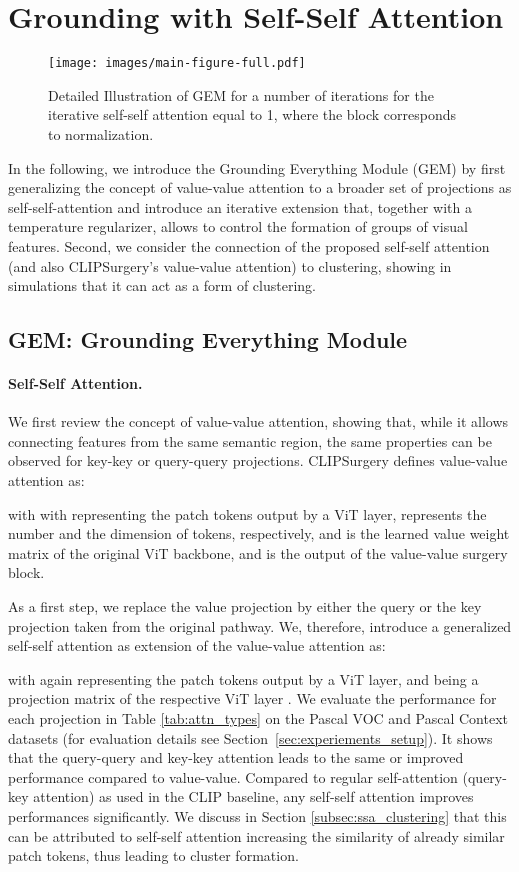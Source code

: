 \documentclass[10pt,twocolumn,letterpaper]{article}
\begin{document}
\section{Grounding with Self-Self Attention}\label{subsec:GEM}
\begin{figure}[t]
\centering
      \texttt{[image: images/main-figure-full.pdf]}
\caption{Detailed Illustration of GEM for a number of iterations for the iterative self-self attention equal to 1, where the block  corresponds to  normalization.}\label{fig:detailed-GEM}
\end{figure}
In the following, we introduce the Grounding Everything Module (GEM) by first generalizing the concept of value-value attention \citep{li2023clipsurgery} to a broader set of projections as self-self-attention and introduce an iterative extension that, together with a temperature regularizer, allows to control the formation of groups of visual features.
Second, we consider the connection of the proposed self-self attention (and also CLIPSurgery's value-value attention) to clustering, showing in simulations that it can act as a form of clustering. 
\subsection{GEM: Grounding Everything Module}\label{subsec:self-self-attn}
\paragraph{Self-Self Attention.}
We first review the concept of value-value attention, showing that, while it allows connecting features from the same semantic region, the same properties can be observed for key-key or query-query projections. CLIPSurgery defines value-value attention as:

with 
 with  representing the patch tokens output by a ViT layer,  represents the number and  the dimension of tokens, respectively, and  is the learned value weight matrix of the original ViT backbone, and  is the output of the value-value surgery block. 

As a first step, we replace the value projection by either the query or the key projection taken from the original pathway. 
We, therefore, introduce a generalized self-self attention  as extension of the value-value attention as:

with  again representing the patch tokens output by a ViT layer, and  being a projection matrix of the respective ViT layer .
We evaluate the performance for each projection in Table \ref{tab:attn_types} on the Pascal VOC and Pascal Context datasets (for evaluation details see Section~\ref{sec:experiements_setup}). It shows that the query-query and key-key attention leads to the same or improved performance compared to value-value. Compared to regular self-attention (query-key attention) as used in the CLIP baseline, any self-self attention improves performances significantly. We discuss in Section \ref{subsec:ssa_clustering} that this can be attributed to self-self attention increasing the similarity of already similar patch tokens, thus leading to cluster formation.
\end{document}
